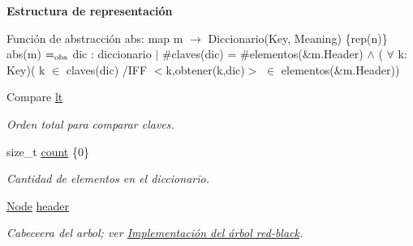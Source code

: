 \begin{Indent}{\bf Estructura de representación}
{\begin{DoxyParagraph}{Función de abstracción}
abs\+: map m $\to$ Diccionario(Key, Meaning) \{rep(n)\}~\newline
abs(m) $=_{\rm obs}$ dic \+: diccionario $\vert$ \#claves(dic) = \#elementos(\&m.\+Header) $\land$ ( $\forall$ k\+: Key)( k $\in$ claves(dic) /\+I\+FF $<$k,obtener(k,dic)$>$ $\in$ elementos(\&m.\+Header)) 
\end{DoxyParagraph}
}\begin{DoxyCompactItemize}
\item 
Compare \hyperlink{classaed2_1_1map_a0e5be36fae0693e4665bd2a615e7550a_a0e5be36fae0693e4665bd2a615e7550a}{lt}
\begin{DoxyCompactList}\small\item\em Orden total para comparar claves. \end{DoxyCompactList}\item 
size\+\_\+t \hyperlink{classaed2_1_1map_a44236c4f16cdc20a10759862b198bde4_a44236c4f16cdc20a10759862b198bde4}{count} \{0\}
\begin{DoxyCompactList}\small\item\em Cantidad de elementos en el diccionario. \end{DoxyCompactList}\item 
\hyperlink{structaed2_1_1map_1_1Node}{Node} \hyperlink{classaed2_1_1map_a92d93f905c8ad73fba18fdc7e8915cce_a92d93f905c8ad73fba18fdc7e8915cce}{header}
\begin{DoxyCompactList}\small\item\em Cabeceera del arbol; ver \hyperlink{Implementacion}{Implementación del árbol red-\/black}. \end{DoxyCompactList}\end{DoxyCompactItemize}
\end{Indent}
